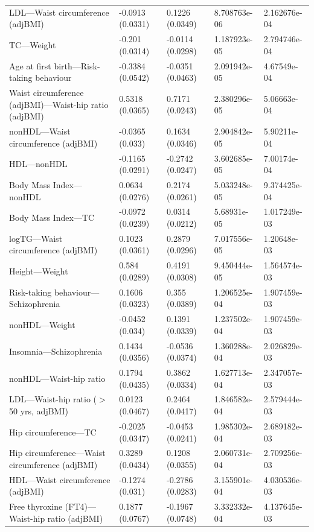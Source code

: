 \begin{table}[ht]
\begin{tabular}{lllll}
  LDL---Waist circumference (adjBMI) & -0.0913 (0.0331) & 0.1226 (0.0349) & 8.708763e-06 & 2.162676e-04 \\ 
  TC---Weight & -0.201 (0.0314) & -0.0114 (0.0298) & 1.187923e-05 & 2.794746e-04 \\ 
  Age at first birth---Risk-taking behaviour & -0.3384 (0.0542) & -0.0351 (0.0463) & 2.091942e-05 & 4.67549e-04 \\ 
  Waist circumference (adjBMI)---Waist-hip ratio (adjBMI) & 0.5318 (0.0365) & 0.7171 (0.0243) & 2.380296e-05 & 5.06663e-04 \\ 
  nonHDL---Waist circumference (adjBMI) & -0.0365 (0.033) & 0.1634 (0.0346) & 2.904842e-05 & 5.90211e-04 \\ 
  HDL---nonHDL & -0.1165 (0.0291) & -0.2742 (0.0247) & 3.602685e-05 & 7.00174e-04 \\ 
  Body Mass Index---nonHDL & 0.0634 (0.0276) & 0.2174 (0.0261) & 5.033248e-05 & 9.374425e-04 \\ 
  Body Mass Index---TC & -0.0972 (0.0239) & 0.0314 (0.0212) & 5.68931e-05 & 1.017249e-03 \\ 
  logTG---Waist circumference (adjBMI) & 0.1023 (0.0361) & 0.2879 (0.0296) & 7.017556e-05 & 1.20648e-03 \\ 
  Height---Weight & 0.584 (0.0289) & 0.4191 (0.0308) & 9.450444e-05 & 1.564574e-03 \\ 
  Risk-taking behaviour---Schizophrenia & 0.1606 (0.0323) & 0.355 (0.0389) & 1.206525e-04 & 1.907459e-03 \\ 
  nonHDL---Weight & -0.0452 (0.034) & 0.1391 (0.0339) & 1.237502e-04 & 1.907459e-03 \\ 
  Insomnia---Schizophrenia & 0.1434 (0.0356) & -0.0536 (0.0374) & 1.360288e-04 & 2.026829e-03 \\ 
  nonHDL---Waist-hip ratio & 0.1794 (0.0435) & 0.3862 (0.0334) & 1.627713e-04 & 2.347057e-03 \\ 
  LDL---Waist-hip ratio ($>$ 50 yrs, adjBMI) & 0.0123 (0.0467) & 0.2464 (0.0417) & 1.846582e-04 & 2.579444e-03 \\ 
  Hip circumference---TC & -0.2025 (0.0347) & -0.0453 (0.0241) & 1.985302e-04 & 2.689182e-03 \\ 
  Hip circumference---Waist circumference (adjBMI) & 0.3289 (0.0434) & 0.1208 (0.0355) & 2.060731e-04 & 2.709256e-03 \\ 
  HDL---Waist circumference (adjBMI) & -0.1274 (0.031) & -0.2786 (0.0283) & 3.155901e-04 & 4.030536e-03 \\ 
  Free thyroxine (FT4)---Waist-hip ratio (adjBMI) & 0.1877 (0.0767) & -0.1967 (0.0748) & 3.332332e-04 & 4.137645e-03 \\ 

\end{tabular}
\end{table}
